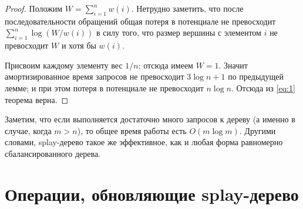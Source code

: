 \documentclass[a4paper,11pt]{article}
\begin{document}
\begin{proof}
    Положим \(W = \sum_{i=1}^n{w(i)}\). Нетрудно заметить, что после последовательности обращений общая потеря в потенциале не превосходит \(\sum_{i=1}^n \log{(W/w(i))}\) в силу того, что размер вершины с элементом \(i\) не превосходит \(W\) и хотя бы \(w(i)\).
    
    Присвоим каждому элементу вес \(1/n\); отсюда имеем \(W = 1\). Значит амортизированное время запросов не превосходит \(3\log{n} + 1\) по предыдущей лемме; и при этом потеря в потенциале не превосходит \(n\log{n}\). Отсюда из \ref{eq:1} теорема верна.
\end{proof}

Заметим, что если выполняется достаточно много запросов к дереву (а именно в случае, когда \(m > n\)), то общее время работы есть \(O(m\log m)\). Другими словами, splay-дерево такое же эффективное, как и любая форма равномерно сбалансированного дерева.

\section{Операции, обновляющие splay-дерево}
\end{document}
